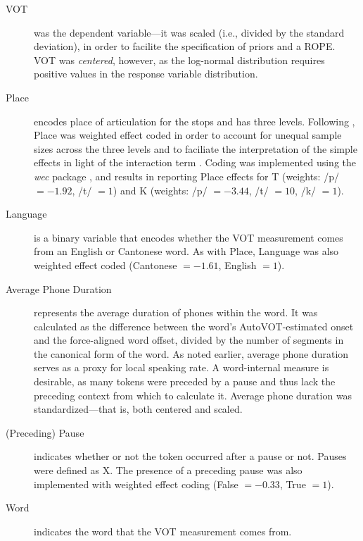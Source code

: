\begin{description}
  \item[VOT] was the dependent variable---it was scaled (i.e., divided by the standard deviation), in order to facilite the specification of priors and a ROPE. VOT was \textit{centered}, however, as the log-normal distribution requires positive values in the response variable distribution.
  \item[Place] encodes place of articulation for the stops and has three levels. Following \citet{chodroff_2017_structure}, Place was weighted effect coded in order to account for unequal sample sizes across the three levels and to faciliate the interpretation of the simple effects in light of the interaction term \citep{brehm_2021_contrasts}. Coding was implemented using the \textit{wec} package \citep{nieuwenhuis_2017_weighted}, and results in reporting Place effects for T (weights: /p/ $=-1.92$, /t/ $=1$) and K (weights: /p/ $=-3.44$, /t/ $=10$, /k/ $=1$).
  \item[Language] is a binary variable that encodes whether the VOT measurement comes from an English or Cantonese word. As with Place, Language was also weighted effect coded (Cantonese $=-1.61$, English $=1$).
  \item[Average Phone Duration] represents the average duration of phones within the word. It was calculated as the difference between the word's AutoVOT-estimated onset and the force-aligned word offset, divided by the number of segments in the canonical form of the word. As noted earlier, average phone duration serves as a proxy for local speaking rate. A word-internal measure is desirable, as many tokens were preceded by a pause and thus lack the preceding context from which to calculate it. Average phone duration was standardized---that is, both centered and scaled. 
  \item[(Preceding) Pause] indicates whether or not the token occurred after a pause or not. Pauses were defined as X. The presence of a preceding pause was also implemented with weighted effect coding (False $=-0.33$, True $=1$).
  \item[Word] indicates the word that the VOT measurement comes from. 
\end{description}

